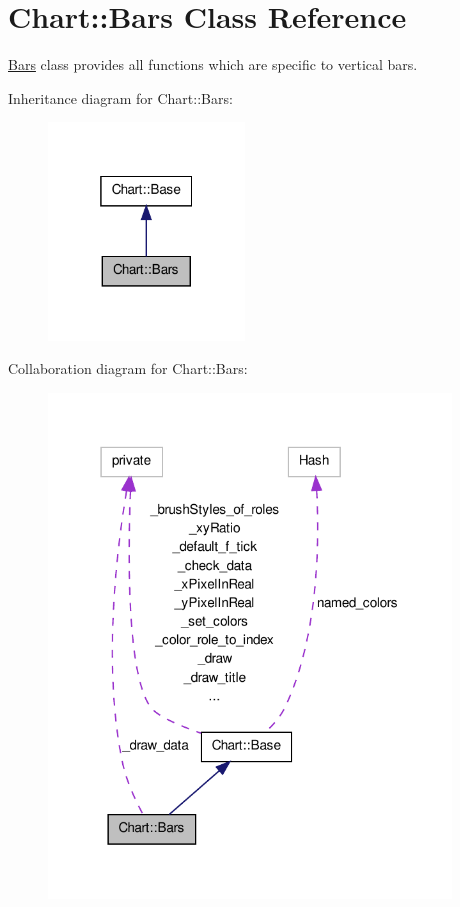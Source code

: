 \hypertarget{classChart_1_1Bars}{
\section{Chart::Bars Class Reference}
\label{classChart_1_1Bars}
}


\hyperlink{classChart_1_1Bars}{Bars} class provides all functions which are specific to vertical bars.  




Inheritance diagram for Chart::Bars:\nopagebreak
\begin{figure}[H]
\begin{center}
\leavevmode
\includegraphics[width=148pt]{classChart_1_1Bars__inherit__graph}
\end{center}
\end{figure}


Collaboration diagram for Chart::Bars:\nopagebreak
\begin{figure}[H]
\begin{center}
\leavevmode
\includegraphics[width=303pt]{classChart_1_1Bars__coll__graph}
\end{center}
\end{figure}
